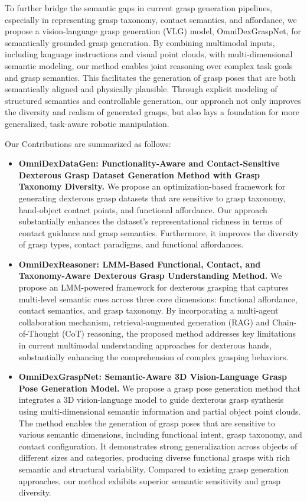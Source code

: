 To further bridge the semantic gaps in current grasp generation pipelines, especially in representing grasp taxonomy, contact semantics, and affordance, we propose a vision-language grasp generation (VLG) model, OmniDexGraspNet, for semantically grounded grasp generation. By combining multimodal inputs, including language instructions and visual point clouds, with multi-dimensional semantic modeling, our method enables joint reasoning over complex task goals and grasp semantics. This facilitates the generation of grasp poses that are both semantically aligned and physically plausible. Through explicit modeling of structured semantics and controllable generation, our approach not only improves the diversity and realism of generated grasps, but also lays a foundation for more generalized, task-aware robotic manipulation.

Our Contributions are summarized as follows:
\begin{itemize}
\item \textbf{OmniDexDataGen: Functionality-Aware and Contact-Sensitive Dexterous Grasp Dataset Generation Method with Grasp Taxonomy Diversity.} We propose an optimization-based framework for generating dexterous grasp datasets that are sensitive to grasp taxonomy, hand-object contact points, and functional affordance. 
Our approach substantially enhances the dataset's representational richness in terms of contact guidance and grasp semantics. Furthermore, it improves the diversity of grasp types, contact paradigms, and functional affordances.

\item \textbf{OmniDexReasoner: LMM-Based Functional, Contact, and Taxonomy-Aware Dexterous Grasp Understanding Method.} 
We propose an LMM-powered framework for dexterous grasping that captures multi-level semantic cues across three core dimensions: functional affordance, contact semantics, and grasp taxonomy. By incorporating a multi-agent collaboration mechanism, retrieval-augmented generation (RAG) and Chain-of-Thought (CoT) reasoning, the proposed method addresses key limitations in current multimodal understanding approaches for dexterous hands, substantially enhancing the comprehension of complex grasping behaviors. 

\item \textbf{OmniDexGraspNet: Semantic-Aware 3D Vision-Language Grasp Pose Generation Model.} 
We propose a grasp pose generation method that integrates a 3D vision-language model to guide dexterous grasp synthesis using multi-dimensional semantic information and partial object point clouds. The method enables the generation of grasp poses that are sensitive to various semantic dimensions, including functional intent, grasp taxonomy, and contact configuration. It demonstrates strong generalization across objects of different sizes and categories, producing diverse functional grasps with rich semantic and structural variability. Compared to existing grasp generation approaches, our method exhibits superior semantic sensitivity and grasp diversity.

\end{itemize}


